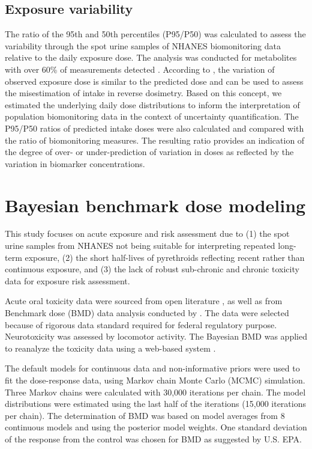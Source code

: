\documentclass[toxics,article,submit,pdftex,moreauthors]{Definitions/mdpi}
\begin{document}
\subsection{Exposure variability}\label{exposure-variability}

The ratio of the 95th and 50th percentiles (P95/P50) was calculated to
assess the variability through the spot urine samples of NHANES
biomonitoring data relative to the daily exposure dose. The analysis was
conducted for metabolites with over 60\% of measurements detected
\citep{faure_evaluation_2020}. According to
\citet{aylward_interpreting_2012}, the variation of observed exposure
dose is similar to the predicted dose and can be used to assess the
misestimation of intake in reverse dosimetry. Based on this concept, we
estimated the underlying daily dose distributions to inform the
interpretation of population biomonitoring data in the context of
uncertainty quantification. The P95/P50 ratios of predicted intake doses were
also calculated and compared with the ratio of biomonitoring measures.
The resulting ratio provides an indication of the degree of over- or
under-prediction of variation in doses as reflected by the variation in
biomarker concentrations.

\section{Bayesian benchmark dose
modeling}\label{bayesian-benchmark-dose-modeling}

This study focuses on acute exposure and risk assessment due to (1) the
spot urine samples from NHANES not being suitable for interpreting
repeated long-term exposure, (2) the short half-lives of pyrethroids
reflecting recent rather than continuous exposure, and (3) the lack of
robust sub-chronic and chronic toxicity data for exposure risk
assessment.

Acute oral toxicity data were sourced from open literature
\citep{wolansky_relative_2006}, as well as from Benchmark dose (BMD)
data analysis conducted by \citet{us2018der}.
The data were selected because of rigorous data standard required for
federal regulatory purpose. Neurotoxicity was assessed by locomotor
activity. The Bayesian BMD was applied to reanalyze the toxicity data
using a web-based system \citep{shao_kan_web_2018}.

The default models for continuous data and non-informative priors were
used to fit the dose-response data, using Markov chain Monte Carlo
(MCMC) simulation. Three Markov chains were calculated with 30,000
iterations per chain. The model distributions were estimated using the
last half of the iterations (15,000 iterations per chain). 
The determination of BMD was based on model averages from 8 continuous models and using the posterior model weights. 
One standard deviation of the response from the control was chosen for BMD as suggested by U.S. EPA.
\end{document}
